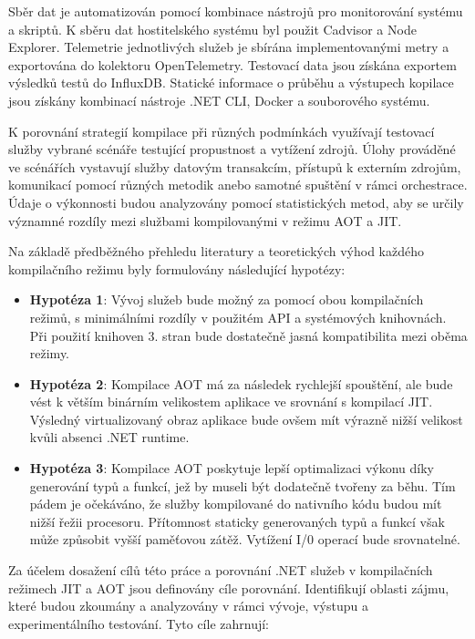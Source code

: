 Sběr dat je automatizován pomocí kombinace nástrojů pro monitorování systému a skriptů. K sběru dat hostitelského systému byl použit Cadvisor a Node Explorer. Telemetrie jednotlivých služeb je sbírána implementovanými metry a exportována do kolektoru OpenTelemetry. Testovací data jsou získána exportem výsledků testů do InfluxDB. Statické informace o průběhu a výstupech kopilace jsou získány kombinací nástroje .NET CLI, Docker a souborového systému.

K porovnání strategií kompilace při různých podmínkách využívají testovací služby vybrané scénáře testující propustnost a vytížení zdrojů. Úlohy prováděné ve scénářích vystavují služby datovým transakcím, přístupů k externím zdrojům, komunikací pomocí různých metodik anebo samotné spuštění v rámci orchestrace. Údaje o výkonnosti budou analyzovány pomocí statistických metod, aby se určily významné rozdíly mezi službami kompilovanými v režimu AOT a JIT. 


Na základě předběžného přehledu literatury a teoretických výhod každého kompilačního režimu byly formulovány následující hypotézy:

\begin{itemize}
    \item \textbf{Hypotéza 1}: Vývoj služeb bude možný za pomocí obou kompilačních režimů, s minimálními rozdíly v použitém API a systémových knihovnách. Při použití knihoven 3. stran bude dostatečně jasná kompatibilita mezi oběma režimy.
    \item \textbf{Hypotéza 2}: Kompilace AOT má za následek rychlejší spouštění, ale bude vést k větším binárním velikostem aplikace ve srovnání s kompilací JIT. Výsledný virtualizovaný obraz aplikace bude ovšem mít výrazně nižší velikost kvůli absenci .NET runtime.
    \item \textbf{Hypotéza 3}: Kompilace AOT poskytuje lepší optimalizaci výkonu díky generování typů a funkcí, jež by museli být dodatečně tvořeny za běhu. Tím pádem je očekáváno, že služby kompilované do nativního kódu budou mít nižší řežii procesoru. Přítomnost staticky generovaných typů a funkcí však může způsobit vyšší paměťovou zátěž. Vytížení I/0 operací bude srovnatelné.
\end{itemize}


Za účelem dosažení cílů této práce a porovnání .NET služeb v kompilačních režimech JIT a AOT jsou definovány cíle porovnání. Identifikují oblasti zájmu, které budou zkoumány a analyzovány v rámci vývoje, výstupu a experimentálního testování. Tyto cíle zahrnují:  

